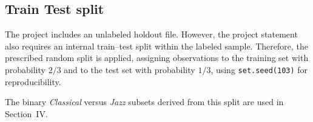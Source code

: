 \subsection{Train Test split}

The project includes an unlabeled holdout file. However, the project statement also requires an internal train--test split within the labeled sample. Therefore, the prescribed random split is applied, assigning observations to the training set with probability \(2/3\) and to the test set with probability \(1/3\), using \texttt{set.seed(103)} for reproducibility.

The binary \textit{Classical} versus \textit{Jazz} subsets derived from this split are used in Section~IV.
